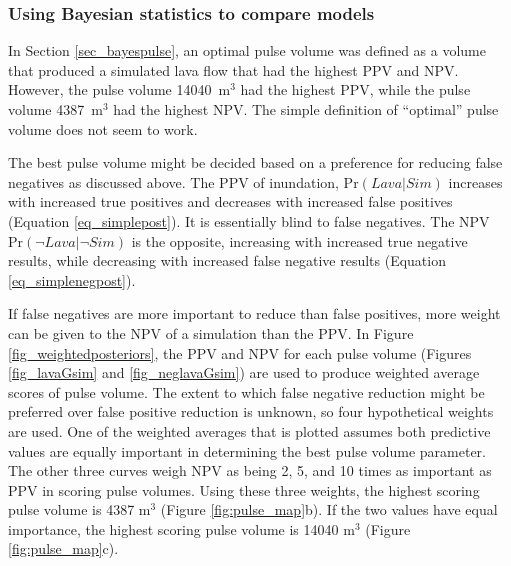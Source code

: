 		\subsubsection{Using Bayesian statistics to compare models}
		In Section \ref{sec_bayespulse}, an optimal pulse volume was defined as a volume that produced a simulated lava flow that had the highest PPV and NPV. However, the pulse volume 14040~m$^3$ had the highest PPV, while the pulse volume 4387~m$^3$ had the highest NPV. The simple definition of ``optimal'' pulse volume does not seem to work.
		
		The best pulse volume might be decided based on a preference for reducing false negatives as discussed above. The PPV of inundation, $\text{Pr}(Lava|Sim)$ increases with increased true positives and decreases with increased false positives (Equation \ref{eq_simplepost}). It is essentially blind to false negatives. The NPV $\text{Pr}(\neg Lava|\neg Sim)$ is the opposite, increasing with increased true negative results, while decreasing with increased false negative results (Equation \ref{eq_simplenegpost}). 
		
		If false negatives are more important to reduce than false positives, more weight can be given to the NPV of a simulation than the PPV. In Figure \ref{fig_weightedposteriors}, the PPV and NPV for each pulse volume (Figures \ref{fig_lavaGsim} and \ref{fig_neglavaGsim}) are used to produce weighted average scores of pulse volume. The extent to which false negative reduction might be preferred over false positive reduction is unknown, so four hypothetical weights are used. One of the weighted averages that is plotted assumes both predictive values are equally important in determining the best pulse volume parameter. The other three curves weigh NPV as being 2, 5, and 10 times as important as PPV in scoring pulse volumes. Using these three weights, the highest scoring pulse volume is 4387 m$^3$ (Figure \ref{fig:pulse_map}b). If the two values have equal importance, the highest scoring pulse volume is 14040 m$^3$ (Figure \ref{fig:pulse_map}c).
		
